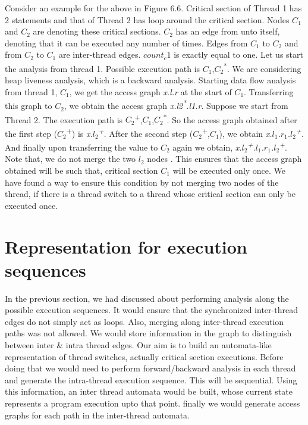 Consider an example for the above in Figure 6.6. Critical section of Thread 1 has 2 statements and that of Thread 2 has loop around the critical section. Nodes $C_1$ and $C_2$ are denoting these critical sections. $C_2$ has an edge from unto itself, denoting that it can be executed any number of times. Edges from $C_1$ to $C_2$ and from $C_2$ to $C_1$ are inter-thread edges. $count_c1$ is exactly equal to one. Let us start the analysis from thread 1. Possible execution path is $C_1$,$C_2$\textsuperscript{*}. We are considering heap liveness analysis, which is a backward analysis. Starting data flow analysis from thread 1, $C_1$, we get the access graph \emph{x.l.r} at the start of $C_1$. Transferring this graph to $C_2$, we obtain the access graph \emph{x.l2\textsuperscript{*}.l1.r}. Suppose we start from Thread 2. The execution path is $C_2$\textsuperscript{+},$C_1$,$C_2$\textsuperscript{*}. So the access graph obtained after the first step ($C_2$\textsuperscript{+}) is \emph{x.$l_2$\textsuperscript{+}}. After the second step ($C_2$\textsuperscript{+},$C_1$), we obtain \emph{x.$l_1$.$r_1$.$l_2$\textsuperscript{+}}. And finally upon transferring the value to $C_2$ again we obtain, \emph{x.$l_2$\textsuperscript{+}.$l_1$.$r_1$.$l_2$\textsuperscript{+}}. Note that, we do not merge the two $l_2$ nodes . This ensures that the access graph obtained will be such that, critical section $C_1$ will be executed only once. We have found a way to ensure this condition by not merging two nodes of the thread, if there is a thread switch to a thread whose critical section can only be executed once.

\section{Representation for execution sequences}

In the previous section, we had discussed about performing analysis along the possible execution sequences. It would ensure that the synchronized inter-thread edges do not simply act as loops. Also, merging along inter-thread execution paths was not allowed. We would store information in the graph to distinguish between inter \& intra thread edges. Our aim is to build an automata-like representation of thread switches, actually critical section executions. Before doing that we would need to perform forward/backward analysis in each thread and generate the intra-thread execution sequence. This will be sequential. Using this information, an inter thread automata would be built, whose current state represents a program execution upto that point. finally we would generate access graphs for each path in the inter-thread automata. \\

